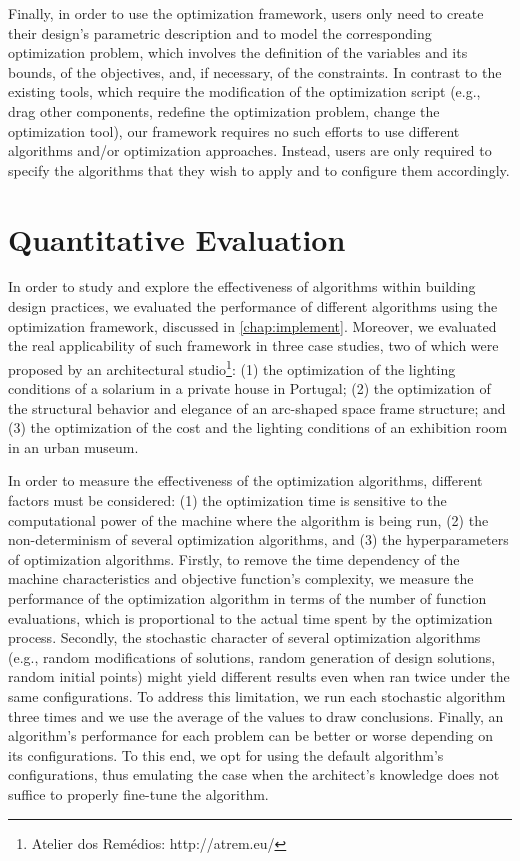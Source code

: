 Finally, in order to use the optimization framework, users only need to create their design's parametric description and to model the corresponding optimization problem, which involves the definition of the variables and its bounds, of the objectives, and, if necessary, of the constraints. In contrast to the existing tools, which require the modification of the optimization script (e.g., drag other components, redefine the optimization problem, change the optimization tool), our framework requires no such efforts to use different algorithms and/or optimization approaches. Instead, users are only required to specify the algorithms that they wish to apply and to configure them accordingly.


\section{Quantitative Evaluation}
\label{sec:quantitative}

In order to study and explore the effectiveness of algorithms within building design practices, we evaluated the performance of different algorithms using the optimization framework, discussed in \cref{chap:implement}. Moreover, we evaluated the real applicability of such framework in three case studies, two of which were proposed by an architectural studio\footnote{Atelier dos Remédios: http://atrem.eu/}: (1) the optimization of the lighting conditions of a solarium in a private house in Portugal; (2) the optimization of the structural behavior and elegance of an arc-shaped space frame structure; and (3) the optimization of the cost and the lighting conditions of an exhibition room in an urban museum.   

In order to measure the effectiveness of the optimization algorithms, different factors must be considered: (1) the optimization time is sensitive to the computational power of the machine where the algorithm is being run, (2) the non-determinism of several optimization algorithms, and (3) the hyperparameters of optimization algorithms. Firstly, to remove the time dependency of the machine characteristics and objective function's complexity, we measure the performance of the optimization algorithm in terms of the number of function evaluations, which is proportional to the actual time spent by the optimization process. Secondly, the stochastic character of several optimization algorithms (e.g., random modifications of solutions, random generation of design solutions, random initial points) might yield different results even when ran twice under the same configurations. To address this limitation, we run each stochastic algorithm three times and we use the average of the values to draw conclusions. Finally, an algorithm's performance for each problem can be better or worse depending on its configurations. To this end, we opt for using the default algorithm's configurations, thus emulating the case when the architect's knowledge does not suffice to properly fine-tune the algorithm. 


